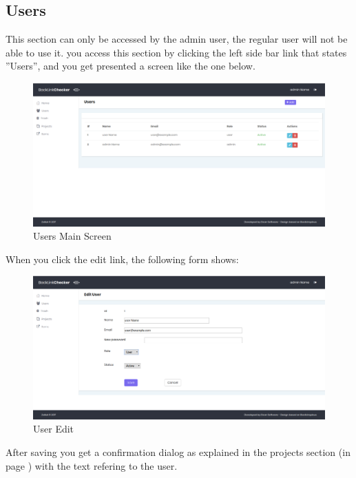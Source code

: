 \subsection{Users}
This section can only be accessed by the admin user, the regular user will not be able to use it. you access this section by clicking the left side bar link that states ''Users'', and you get presented a screen like the one below.
\begin{figure}[H]
	\caption{Users Main Screen}
	\label{img:usrmain}
	\includegraphics[width=\textwidth]{images/users_screenshot}
\end{figure}

When you click the edit link, the following form shows:
\begin{figure}[H]
	\caption{User Edit}
	\label{img:usredit}
	\includegraphics[width=\textwidth]{images/users_edit}
\end{figure}

After saving you get a confirmation dialog as explained in the projects section (in page \pageref{img:confirm}) with the text refering to the user.

